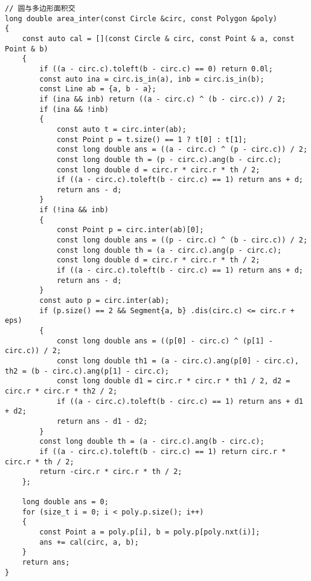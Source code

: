 \documentclass[a4paper,10pt]{article}
\begin{document}
\begin{lstlisting}
// 圆与多边形面积交
long double area_inter(const Circle &circ, const Polygon &poly)
{
    const auto cal = [](const Circle & circ, const Point & a, const Point & b)
    {
        if ((a - circ.c).toleft(b - circ.c) == 0) return 0.0l;
        const auto ina = circ.is_in(a), inb = circ.is_in(b);
        const Line ab = {a, b - a};
        if (ina && inb) return ((a - circ.c) ^ (b - circ.c)) / 2;
        if (ina && !inb)
        {
            const auto t = circ.inter(ab);
            const Point p = t.size() == 1 ? t[0] : t[1];
            const long double ans = ((a - circ.c) ^ (p - circ.c)) / 2;
            const long double th = (p - circ.c).ang(b - circ.c);
            const long double d = circ.r * circ.r * th / 2;
            if ((a - circ.c).toleft(b - circ.c) == 1) return ans + d;
            return ans - d;
        }
        if (!ina && inb)
        {
            const Point p = circ.inter(ab)[0];
            const long double ans = ((p - circ.c) ^ (b - circ.c)) / 2;
            const long double th = (a - circ.c).ang(p - circ.c);
            const long double d = circ.r * circ.r * th / 2;
            if ((a - circ.c).toleft(b - circ.c) == 1) return ans + d;
            return ans - d;
        }
        const auto p = circ.inter(ab);
        if (p.size() == 2 && Segment{a, b} .dis(circ.c) <= circ.r + eps)
        {
            const long double ans = ((p[0] - circ.c) ^ (p[1] - circ.c)) / 2;
            const long double th1 = (a - circ.c).ang(p[0] - circ.c), th2 = (b - circ.c).ang(p[1] - circ.c);
            const long double d1 = circ.r * circ.r * th1 / 2, d2 = circ.r * circ.r * th2 / 2;
            if ((a - circ.c).toleft(b - circ.c) == 1) return ans + d1 + d2;
            return ans - d1 - d2;
        }
        const long double th = (a - circ.c).ang(b - circ.c);
        if ((a - circ.c).toleft(b - circ.c) == 1) return circ.r * circ.r * th / 2;
        return -circ.r * circ.r * th / 2;
    };

    long double ans = 0;
    for (size_t i = 0; i < poly.p.size(); i++)
    {
        const Point a = poly.p[i], b = poly.p[poly.nxt(i)];
        ans += cal(circ, a, b);
    }
    return ans;
}



\end{lstlisting}
\end{document}
